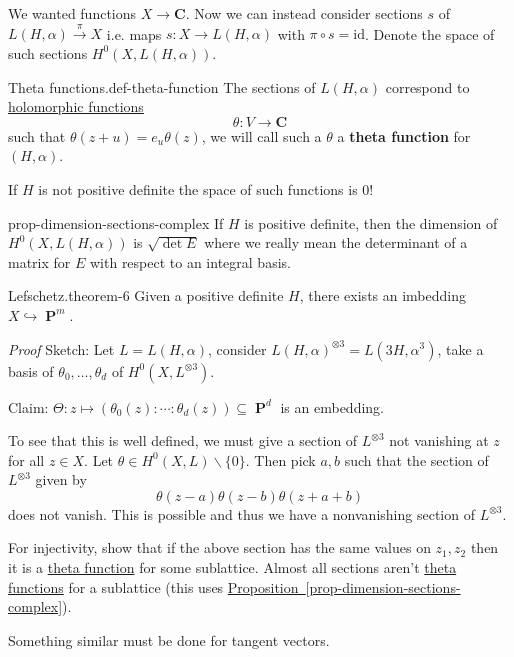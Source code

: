 \documentclass[10pt,]{book}
\makeatletter
\newcommand{\terminology}[1]{\textbf{#1}}
\renewcommand*{\proofname}{Proof}
\renewenvironment{proof}[1][\proofname]{\par
  \pushQED{\qed}%
  \normalfont \topsep6\p@\@plus6\p@\relax
  \trivlist
  \item\relax
    {\itshape
    #1\@addpunct{.}}\hspace\labelsep\ignorespaces
}{%
  \popQED\endtrivlist\@endpefalse
}
\numberwithin{equation}{section}
\newcommand{\CC}{\mathbf{C}}
\newcommand{\id}{\mathrm{id}}
\DeclareMathOperator{\PP}{\mathbf{P}}
\makeatother
\begin{document}
\hypertarget{p-61}{}%
We wanted functions \(X\to \CC\). Now we can instead consider sections \(s\) of \(L(H,\alpha) \xrightarrow{\pi} X\) i.e. maps \(s\colon X\to L(H,\alpha)\) with \(\pi\circ s = \id\). Denote the space of such sections \(H^0(X,L(H,\alpha))\).%
\begin{definition}{Theta functions.}{def-theta-function}%
\hypertarget{p-62}{}%
The sections of \(L(H, \alpha)\)  correspond to \hyperref[def-morph-riem-surf]{holomorphic functions}%
\begin{equation*}
\theta \colon V \to \CC
\end{equation*}
such that \(\theta(z+ u) = e_u \theta(z)\), we will call such a \(\theta\) a \terminology{theta function} for \((H,\alpha)\).%
\end{definition}
\hypertarget{p-63}{}%
If \(H\) is not positive definite the space of such functions is 0!%
\begin{proposition}{}{}{prop-dimension-sections-complex}%
\hypertarget{p-64}{}%
If \(H\) is positive definite, then the dimension of \(H^0(X, L(H,\alpha))\) is \(\sqrt{\det E}\) where we really mean the determinant of a matrix for \(E\) with respect to an integral basis.%
\end{proposition}
\begin{theorem}{Lefschetz.}{}{theorem-6}%
\hypertarget{p-65}{}%
Given a positive definite \(H\), there exists an imbedding \(X \hookrightarrow \PP^m\).%
\end{theorem}
\begin{proof}\hypertarget{proof-11}{}
\hypertarget{p-66}{}%
Sketch: Let \(L = L(H,\alpha)\), consider \(L(H,\alpha)^{\otimes 3} = L(3H, \alpha^3)\), take a basis of \(\theta_0,\ldots, \theta_d\) of \(H^0(X, L^{\otimes 3})\).%
\par
\hypertarget{p-67}{}%
Claim: \(\Theta\colon z\mapsto (\theta_0(z) :\cdots :\theta_d (z)) \subseteq \PP^d\) is an embedding.%
\par
\hypertarget{p-68}{}%
To see that this is well defined, we must give a section of \(L^{\otimes 3}\) not vanishing at \(z\) for all \(z\in X\). Let \(\theta \in H^0(X,L)\smallsetminus \{0\}\). Then pick \(a,b\) such that the section of \(L^{\otimes 3}\) given by%
\begin{equation*}
\theta(z-a)\theta(z-b) \theta(z+ a+b)
\end{equation*}
does not vanish. This is possible and thus we have a nonvanishing section of \(L^{\otimes 3}\).%
\par
\hypertarget{p-69}{}%
For injectivity, show that if the above section has the same values on \(z_1,z_2\) then it is a \hyperref[def-theta-function]{theta function} for some sublattice. Almost all sections aren't \hyperref[def-theta-function]{theta functions} for a sublattice (this uses \hyperref[prop-dimension-sections-complex]{Proposition~\ref{prop-dimension-sections-complex}}).%
\par
\hypertarget{p-70}{}%
Something similar must be done for tangent vectors.%
\end{proof}
\end{document}
